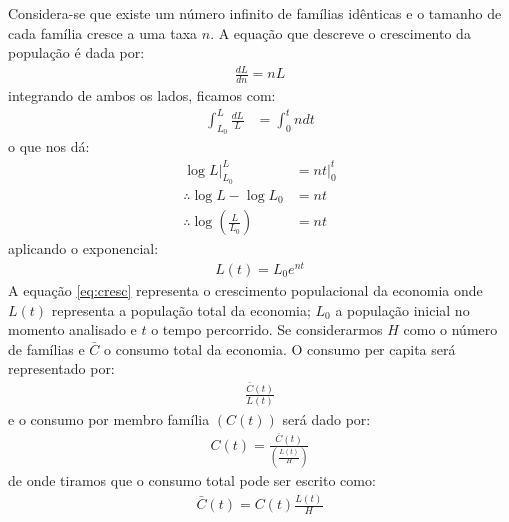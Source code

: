 \documentclass[11pt,a4paper]{article}
\begin{document}
Considera-se que existe um número infinito de famílias idênticas e o tamanho de cada família cresce a uma taxa $n$. A equação que descreve o crescimento da população é dada por:
\begin{align*}
\frac{dL}{dn} = nL
\end{align*}
\noindent
integrando de ambos os lados, ficamos com:
\begin{align*}
\int_{L_0}^{L}\frac{dL}{L} &= \int_0 ^t ndt 
\end{align*}
\noindent
o que nos dá:
\begin{align*}
\log L\Big|_{L_0}^{L} &= nt\Big|_0^t \\
\therefore \log L - \log L_0 &= nt \\
\therefore \log \left(\frac{L}{L_0}\right) &= nt 
\end{align*}
\noindent
aplicando o exponencial:
\begin{align} \label{eq:cresc}
L(t) = L_0 e^{nt}
\end{align}
A equação \eqref{eq:cresc} representa o crescimento populacional da economia onde $L(t)$ representa a população total da economia; $L_0$ a população inicial no momento analisado e $t$ o tempo percorrido. Se considerarmos $H$ como o número de famílias e $\bar{C}$ o consumo total da economia. O consumo per capita será representado por:
\begin{align*}
\frac{\bar{C}(t)}{L(t)}
\end{align*} 
\noindent
e o consumo por membro família $(C(t))$ será dado por:
\begin{align} \label{eq:fam}
C(t) = \frac{\bar{C}(t)}{\left(\frac{L(t)}{H}\right)}
\end{align}
\noindent
de onde tiramos que o consumo total pode ser escrito como:
\begin{align*}
\bar{C}(t) = C(t)\frac{L(t)}{H}
\end{align*}
\end{document}
